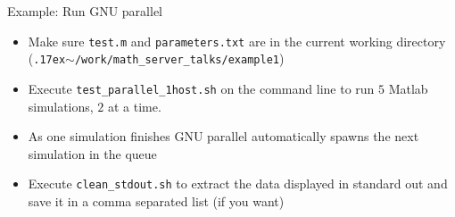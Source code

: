 \documentclass{beamer}
\begin{document}
\begin{frame}{Example: Run GNU parallel}
\begin{itemize}
	\item Make sure \texttt{test.m} and \texttt{parameters.txt} are in the current working directory (\texttt{{\raise.17ex\hbox{$\scriptstyle\mathtt{\sim}$}}/work/math\_server\_talks/example1})
	\item Execute \texttt{test\_parallel\_1host.sh} on the command line to run $5$ Matlab simulations, $2$ at a time.
	\item As one simulation finishes GNU parallel automatically spawns the next simulation in the queue
	\item Execute \texttt{clean\_stdout.sh} to extract the data displayed in standard out and save it in a comma separated list (if you want)
\end{itemize}
\end{frame}

\end{document}
